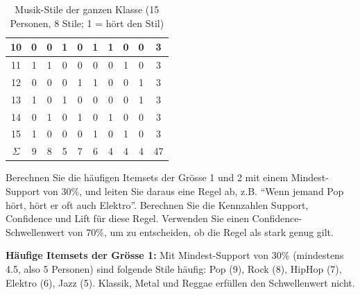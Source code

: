\begin{myexercise}
\begin{table}[H]
\begin{tabular}{c|c|c|c|c|c|c|c|c||c}
            10              & 0            & 0             & 1             & 0               & 1                & 1                & 0              & 0               & 3        \\\midrule
            11              & 1            & 1             & 0             & 0               & 0                & 0                & 1              & 0               & 3        \\\midrule
            12              & 0            & 0             & 0             & 1               & 1                & 0                & 0              & 1               & 3        \\\midrule
            13              & 1            & 0             & 1             & 0               & 0                & 0                & 0              & 1               & 3        \\\midrule
            14              & 0            & 1             & 0             & 1               & 0                & 1                & 0              & 0               & 3        \\\midrule
            15              & 1            & 0             & 0             & 0               & 1                & 0                & 1              & 0               & 3        \\\midrule
            \midrule\midrule
            $\Sigma$        & 9            & 8             & 5             & 7               & 6                & 4                & 4              & 4               & 47       \\
        \end{tabular}
        \caption{Musik-Stile der ganzen Klasse (15 Personen, 8 Stile; 1 = hört den Stil)}
    \end{table}
    Berechnen Sie die häufigen Itemsets der Grösse 1 und 2 mit einem Mindest-Support von 30\%, und leiten Sie daraus eine Regel ab, z.B. \enquote{Wenn jemand Pop hört, hört er oft auch Elektro}. Berechnen Sie die Kennzahlen Support, Confidence und Lift für diese Regel. Verwenden Sie einen Confidence-Schwellenwert von 70\%, um zu entscheiden, ob die Regel als stark genug gilt.

    \begin{myanswer}
        \textbf{Häufige Itemsets der Grösse 1:} Mit Mindest-Support von 30\% (mindestens 4.5, also 5 Personen) sind folgende Stile häufig:
        Pop (9), Rock (8), HipHop (7), Elektro (6), Jazz (5). Klassik, Metal und Reggae erfüllen den Schwellenwert nicht.


\end{myanswer}
\end{myexercise}
